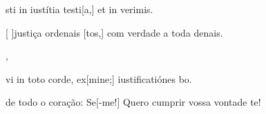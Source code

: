 {  {\item {}sti in iustítia testi[a,] et in verimis.}%
    {\item {}[ ]{jus}tiça ordenais [tos,] com verdade a toda denais.},
  {\item {}vi in toto corde, ex[mine;] iustificatiónes bo.}%
    {\item {} de todo o coração: Se[-me!] Quero cumprir vossa vontade te!}
}
